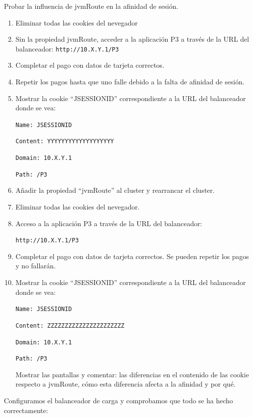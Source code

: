 \documentclass[a4paper, 10pt]{article}
\begin{document}
\begin{mdframed}
	Probar la influencia de jvmRoute en la afinidad de sesión. 
	\begin{enumerate}
		\item Eliminar todas las cookies del nevegador 
		\item Sin la propiedad jvmRoute, acceder a la aplicación P3 a través de la URL del balanceador:
		\texttt{http://10.X.Y.1/P3}
		\item Completar el pago con datos de tarjeta correctos. 
		\item Repetir los pagos hasta que uno falle debido a la falta de afinidad de sesión. 
		\item  Mostrar la cookie “JSESSIONID” correspondiente a la URL del balanceador donde se vea: 
		
		\texttt{Name: JSESSIONID}
			
		\texttt{Content: YYYYYYYYYYYYYYYYYYY}
			
		\texttt{Domain: 10.X.Y.1}
			
		\texttt{Path: /P3 }
		
		\item Añadir la propiedad “jvmRoute” al cluster y rearrancar el cluster. 
		\item Eliminar todas las cookies del nevegador. 
		\item Acceso a la aplicación P3 a través de la URL del balanceador: 
		
		\texttt{http://10.X.Y.1/P3}
		\item  Completar el pago con datos de tarjeta correctos. Se pueden repetir los pagos y no fallarán. 
		\item  Mostrar la cookie “JSESSIONID” correspondiente a la URL del balanceador donde se vea:
		
		\texttt{Name: JSESSIONID}
		
		\texttt{Content: ZZZZZZZZZZZZZZZZZZZZZZ}
		
		\texttt{Domain: 10.X.Y.1}
		
		\texttt{Path: /P3} 
		
		Mostrar las pantallas y comentar: las diferencias en el contenido de las cookie respecto a jvmRoute, cómo esta diferencia afecta a la afinidad y por qué.
	\end{enumerate}
\end{mdframed}
\newpage
Configuramos el balanceador de carga y comprobamos que todo se ha hecho correctamente:
\end{document}
